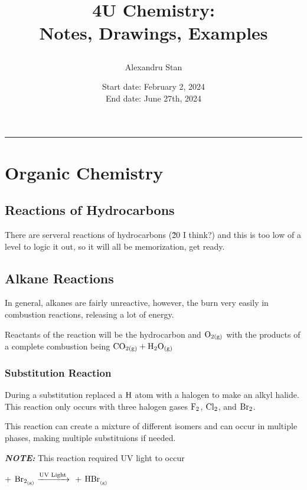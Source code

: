 \documentclass[12pt, a4paper]{article}
\title{
    \textbf{4U Chemistry:\\ Notes, Drawings, Examples}
    \author{Alexandru Stan}
    \date{Start date: February 2, 2024 \\ End date: June 27th, 2024}
}
\newcommand{\fline}{\par\noindent\rule{\textwidth}{0.1pt}}
\newcommand{\gas}{_{\text{(g)}}}
\begin{document}
    \maketitle
    \vfill
    \newpage 

    \tableofcontents
    \fline
    \newpage

    \section{Organic Chemistry}

    \subsection{Reactions of Hydrocarbons}

    There are serveral reactions of hydrocarbons (\~20 I think?) and this is
    too low of a level to logic it out, so it will all be memorization, get
    ready.

    \subsection{Alkane Reactions}

    In general, alkanes are fairly unreactive, however, the burn very easily in combustion
    reactions, releasing a lot of energy.

    Reactants of the reaction will be the hydrocarbon and $\ce{O_{2\text{(g)}}}$ with the products
    of a complete combustion being $\ce{CO_{2\text{(g)}} + H2O_{\text{(g)}}}$

    \subsubsection{Substitution Reaction}

    During a substitution replaced a $\ce{H}$ atom with a halogen to make
    an alkyl halide. This reaction only occurs with three halogen gases $\ce{F2}$, 
    $\ce{Cl2}$, and $\ce{Br2}$. 

    This reaction can create a mixture of different isomers and can occur in multiple
    phases, making multiple substituions if needed.

    \textbf{\textit{NOTE:}} This reaction required UV light to occur

    \begin{center}
        + $\ce{Br_{2\gas} ->[\text{UV Light}]}$ 
        + $\ce{HBr_{\gas}}$
    \end{center}
    
\end{document}
